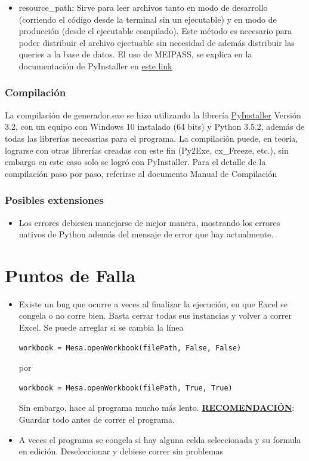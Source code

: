 \documentclass{article}
\begin{document}
\begin{itemize}
\item resource\_path: Sirve para leer archivos tanto en modo de desarrollo (corriendo el código desde la terminal sin un ejecutable) y en modo de producción (desde el ejecutable compilado). Este método es necesario para poder distribuir el archivo ejectuable sin necesidad de además distribuir las queries a la base de datos. El uso de MEIPASS, se explica en la documentación de PyInstaller en \href{https://pythonhosted.org/PyInstaller/runtime-information.html}{este link}


\end{itemize}

\subsubsection{Compilación}
La compilación de generador.exe se hizo utilizando la librería \href{http://www.pyinstaller.org/}{PyInstaller} Versión 3.2, con un equipo con Windows 10 instalado (64 bits) y Python 3.5.2, además de todas las librerías neceasrias para el programa. La compilación puede, en teoría, lograrse con otras librerías creadas con este fin (Py2Exe, cx\_Freeze, etc.), sin embargo en este caso solo se logró con PyInstaller. Para el detalle de la compilación paso por paso, referirse al documento Manual de Compilación 

\subsubsection{Posibles extensiones}
\begin{itemize}
\item Los errores debiesen manejarse de mejor manera, mostrando los errores nativos de Python además del mensaje de error que hay actualmente.
\end{itemize}


\section{Puntos de Falla}
\begin{itemize}
\item Existe un bug que ocurre a veces al finalizar la ejecución, en que Excel se congela o no corre bien. Basta cerrar todas sus instancias y volver a correr Excel. Se puede arreglar si se cambia la línea 
\begin{lstlisting}
workbook = Mesa.openWorkbook(filePath, False, False)
\end{lstlisting}
por 
\begin{lstlisting}
workbook = Mesa.openWorkbook(filePath, True, True)
\end{lstlisting}
Sin embargo, hace al programa mucho más lento. 
\textbf{\underline{RECOMENDACIÓN}}: Guardar todo antes de correr el programa. 
\item A veces el programa se congela si hay alguna celda seleccionada y su formula en edición. Deseleccionar y debiese correr sin problemas
\end{itemize}
\end{document}
